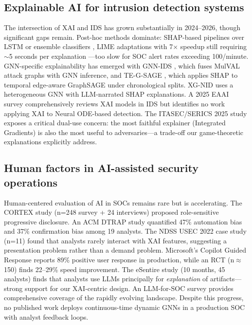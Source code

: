 \documentclass[preprint,review,12pt]{elsarticle}
\begin{document}
\subsection{Explainable AI for intrusion detection systems}

The intersection of XAI and IDS has grown substantially in 2024--2026, though significant gaps remain. Post-hoc methods dominate: SHAP-based pipelines over LSTM or ensemble classifiers \cite{ben_ncir_2024, enhancing_ids_ensemble_2024}, LIME adaptations with 7$\times$ speedup still requiring $\sim$5 seconds per explanation \cite{nugraha_2025}---too slow for SOC alert rates exceeding 100/minute. GNN-specific explainability has emerged with GNN-IDS \cite{gnn_ids_2024}, which fuses MulVAL attack graphs with GNN inference, and TE-G-SAGE \cite{te_gsage_2025}, which applies SHAP to temporal edge-aware GraphSAGE under chronological splits. XG-NID \cite{xg_nid_2024} uses a heterogeneous GNN with LLM-narrated SHAP explanations. A 2025 EAAI survey \cite{eaai_xai_ids_2025} comprehensively reviews XAI models in IDS but identifies no work applying XAI to Neural ODE-based detection. The ITASEC/SERICS 2025 study \cite{itasec_dual_use_2025} exposes a critical dual-use concern: the most faithful explainer (Integrated Gradients) is also the most useful to adversaries---a trade-off our game-theoretic explanations explicitly address.

\subsection{Human factors in AI-assisted security operations}

Human-centered evaluation of AI in SOCs remains rare but is accelerating. The CORTEX study \cite{cortex2025} (n=248 survey + 24 interviews) proposed role-sensitive progressive disclosure. An ACM DTRAP study \cite{acm_dtrap_2025} quantified 47\% automation bias and 37\% confirmation bias among 19 analysts. The NDSS USEC 2022 case study \cite{ndss_usec_2022} (n=11) found that analysts rarely interact with XAI features, suggesting a presentation problem rather than a demand problem. Microsoft's Copilot Guided Response \cite{microsoft_cgr_2024} reports 89\% positive user response in production, while an RCT \cite{microsoft_rct_2024} (n$\approx$150) finds 22--29\% speed improvement. The eSentire study \cite{esentire_2025} (10 months, 45 analysts) finds that analysts use LLMs principally for \textit{explanation} of artifacts---strong support for our XAI-centric design. An LLM-for-SOC survey \cite{llm_soc_survey_2025} provides comprehensive coverage of the rapidly evolving landscape. Despite this progress, no published work deploys continuous-time dynamic GNNs in a production SOC with analyst feedback loops.
\end{document}

